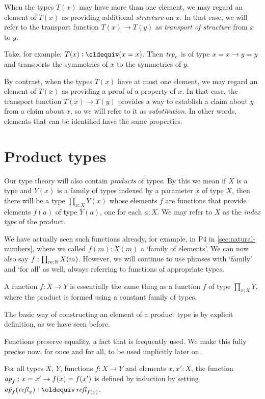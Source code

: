 When the types $T(x)$ may have more than one element, 
we may regard an element of $T(x)$ as providing additional {\em structure} on $x$. 
In that case, we will refer to the transport function $T(x) \to T(y)$ as 
\emph{transport of structure} from $x$ to $y$. 

Take, for example, $T(x)\defeq (x=x)$. 
Then $\mathop{\mathit{trp}_{e}}$ is of type $x=x \to y=y$ and transports the
symmetries of $x$ to the symmetries of $y$.

By contrast, when the types
$T(x)$ have at most one element, we may regard an element of $T(x)$ 
as providing a proof of a property of $x$. In that case, the transport
function $T(x) \to T(y)$ provides a way to establish a claim about $y$ 
from a claim about $x$, so we will refer to it as \emph{substitution}.  In
other words, elements that can be identified have the same properties.



\section{Product types}
\label{sec:product-types}
Our type theory will also contain \emph{products} of types. 
By this we mean if $X$ is a type and $Y(x)$ is a family of types indexed by a
parameter $x$ of type $X$, then there will be a type $\prod_{x:X} Y(x)$ 
whose elements $f$ are functions that provide elements $f(a)$ of type
$Y(a)$, one for each $a:X$. We may refer to $X$ as the 
\emph{index type} of the product.

We have actually seen such functions already, for example,
in P4 in \cref{sec:natural-numbers}, where
we called $f(m):X(m)$ a `family of elements'. We can now
also say $f: \prod_{m:\mathbb{N}} X(m)$. However, we will continue to use
phrases with `family' and `for all' as well, always referring to functions
of appropriate types.

A function $f : X \to Y$ is essentially the same thing as a function $f$ 
of type $\prod_{x:X} Y$, where the product is formed using a constant family of types.

The basic way of constructing an element of a product type
is by explicit definition, as we have seen before.

Functions preserve equality, a fact that is frequently used.
We make this fully precise now, for once and for all, 
to be used implicitly later on.

\begin{definition}\label{def:ap}
For all types $X$, $Y$, functions $f:X\to Y$ and elements $x,x':X$, the function
$\mathop{{\it ap}_{f}} : x = x' \to f(x) = f(x')$ is defined by induction by setting 
$\ap{f}(\refl{x})\defeq\refl{f(x)}$.
\end{definition}

